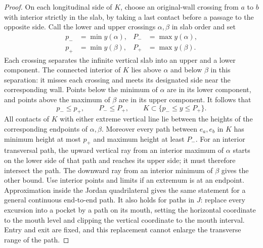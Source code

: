 \begin{proof}
On each longitudinal side of $K$, choose an original-wall crossing
from $a$ to $b$ with interior strictly in the slab, by taking a last
contact before a passage to the opposite side.  Call the lower and
upper crossings $\alpha,\beta$ in slab order and set
\begin{align*}
 p_-&=\min y(\alpha),& P_-&=\max y(\alpha),\\
 p_+&=\min y(\beta),& P_+&=\max y(\beta).
\end{align*}
Each crossing separates the infinite vertical slab into an upper and a
lower component. The connected interior of $K$ lies above $\alpha$ and
below $\beta$ in this separation: it misses each crossing and meets its
designated side near the corresponding wall. Points below the minimum
of $\alpha$ are in its lower component, and points above the maximum
of $\beta$ are in its upper component. It follows that
\begin{equation}
 p_-\le p_+,\qquad P_-\le P_+,
 \qquad K\subset\{p_-\le y\le P_+\}.
 \label{rect:envelope}
\end{equation}
All contacts of $K$ with either extreme vertical line lie between the
heights of the corresponding endpoints of $\alpha,\beta$.
Moreover every path between $e_a,e_b$ in $K$ has minimum height at most
$p_+$ and maximum height at least $P_-$.  For an interior transversal
path, the upward vertical ray from an interior maximum of $\alpha$
starts on the lower side of that path and reaches its upper side;
it must therefore intersect the path. The downward ray from an
interior minimum of $\beta$ gives the other bound. Use interior
points and limits if an extremum is at an endpoint.
Approximation inside the Jordan quadrilateral gives the same statement
for a general continuous end-to-end path.  It also holds for paths in
$J$: replace every excursion into a pocket by a path on its mouth,
setting the horizontal coordinate to the mouth level and clipping the
vertical coordinate to the mouth interval.  Entry and exit are fixed,
and this replacement cannot enlarge the transverse range of the path.


\end{proof}
